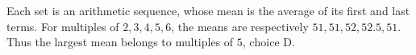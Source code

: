 Each set is an arithmetic sequence, whose mean is the average of its first and last terms. For multiples of $2,3,4,5,6$, the means are respectively $51,51,52,52.5,51$. Thus the largest mean belongs to multiples of $5$, $\boxed{\text{choice D}}$.
